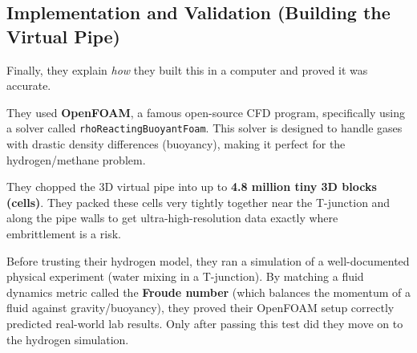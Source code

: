 \documentclass[12pt,a4paper]{report}
\begin{document}
\subsection{Implementation and Validation (Building the Virtual Pipe)}

Finally, they explain \textit{how} they built this in a computer and proved it was accurate.

\begin{description}[style=nextline, font=\normalfont\bfseries, leftmargin=1.5em]

  \item[The Software:]
  They used \textbf{OpenFOAM}, a famous open-source CFD program, specifically using a solver called \texttt{rhoReactingBuoyantFoam}. This solver is designed to handle gases with drastic density differences (buoyancy), making it perfect for the hydrogen/methane problem.

  \item[The Mesh:]
  They chopped the 3D virtual pipe into up to \textbf{4.8 million tiny 3D blocks (cells)}. They packed these cells very tightly together near the T-junction and along the pipe walls to get ultra-high-resolution data exactly where embrittlement is a risk.

  \item[Validation:]
  Before trusting their hydrogen model, they ran a simulation of a well-documented physical experiment (water mixing in a T-junction). By matching a fluid dynamics metric called the \textbf{Froude number} (which balances the momentum of a fluid against gravity/buoyancy), they proved their OpenFOAM setup correctly predicted real-world lab results. Only after passing this test did they move on to the hydrogen simulation.

\end{description}
\end{document}
